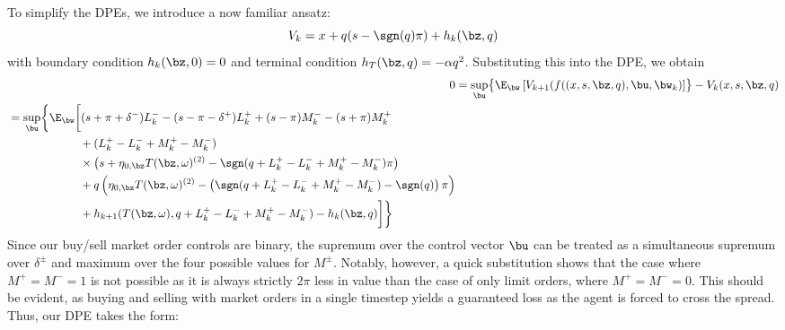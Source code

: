 \documentclass[12pt]{article}
\begin{document}
To simplify the DPEs, we introduce a now familiar ansatz:
\begin{equation}
\label{eq:ansatzHcase1discrete}
V_k = x + q(s-\sgn(q)\pi) + h_k(\bz,q)
\end{equation}
with boundary condition $h_k(\bz,0) = 0$ and terminal condition $h_T(\bz,q) = -\alpha q^2$. Substituting this into the DPE, we obtain
\begin{align}
0 & = \sup_{\bu} \bigl\lbrace \E_{\bw} \left[ V_{k+1} (f((x,s,\bz,q),\bu,\bw_k) \right] \bigr\rbrace - V_k (x,s,\bz,q)  \nonumber \\
\begin{split} & = \sup_{\bu} \biggl\lbrace \E_{\bw} \biggl[
(s + \pi + \delta^-)L_k^- - (s - \pi - \delta^+)L_k^+ + (s - \pi)M_k^- - (s + \pi)M_k^+ \\
& \hphantom{\sup_{\bu} \biggl\lbrace \E_{\bw} \biggl[ {}+{}} + (L_k^+ - L_k^- + M_k^+ - M_k^-) \\
& \hphantom{\sup_{\bu} \biggl\lbrace \E_{\bw} \biggl[ {}+{}} \times \bigl( s + \eta_{0,\bz} T(\bz, \omega)^{(2)}  -\sgn( q + L_k^+ - L_k^- + M_k^+ - M_k^-)\pi   \bigr) \\
& \hphantom{\sup_{\bu} \biggl\lbrace \E_{\bw} \biggl[ {}+{}} + q\left( \eta_{0,\bz} T(\bz, \omega)^{(2)}  -\left( \sgn( q + L_k^+ - L_k^- + M_k^+ - M_k^-) - \sgn(q) \right) \pi \right) \\
& \hphantom{\sup_{\bu} \biggl\lbrace \E_{\bw} \biggl[ {}+{}} + h_{k+1}(T(\bz,\omega), q + L_k^+ - L_k^- + M_k^+ - M_k^-) -  h_k(\bz,q) \biggr] \biggr\rbrace 
\end{split}
\end{align}
Since our buy/sell market order controls are binary, the supremum over the control vector $\bu$ can be treated as a simultaneous supremum over $\delta^\pm$ and maximum over the four possible values for $M^\pm$. Notably, however, a quick substitution shows that the case where $M^+ = M^- = 1$ is not possible as it is always strictly $2\pi$ less in value than the case of only limit orders, where $M^+ = M^- = 0$. This should be evident, as buying and selling with market orders in a single timestep yields a guaranteed loss as the agent is forced to cross the spread. Thus, our DPE takes the form:
\end{document}
